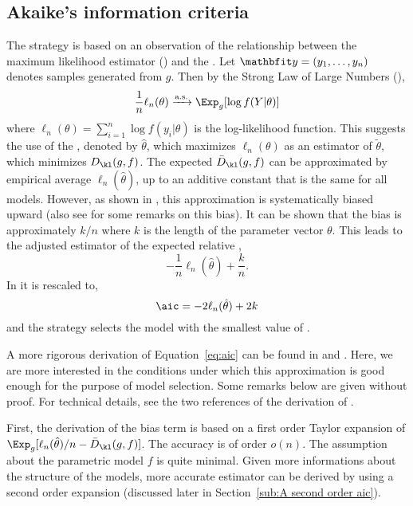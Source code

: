 \subsection{Akaike's information criteria}
\label{sub:Akaike's information criteria}

The \aic strategy is based on an observation of the relationship between the
maximum likelihood estimator (\mle) and the \kld. Let $\data =
(y_1,\dots,y_n)$ denotes \iid samples generated from $g$. Then by the Strong
Law of Large Numbers (\slln),
\begin{equation}
  \frac{1}{n}\ell_n(\theta) \xrightarrow{\text{a.s.}} \Exp_g[\log f(Y|\theta)]
  \label{eq:ml convergence}
\end{equation}
where $\ell_n(\theta) = \sum_{i=1}^n \log f(y_i|\theta)$ is the
log-likelihood function. This suggests the use of the \mle, denoted by
$\hat\theta$, which maximizes $\ell_n(\theta)$ as an estimator of
$\tilde\theta$, which minimizes $D_{\kl}(g,f)$. The expected \kld
$\bar{D}_{\kl}(g,f)$ can be approximated by empirical average
$\ell_n(\hat\theta)$, up to an additive constant that is the same for all
models. However, as shown in \cite{Akaike:1973uc}, this approximation is
systematically biased upward (also see \cite[][sec.~2.3]{Claeskens:2008tq}
for some remarks on this bias). It can be shown that the bias is
approximately $k/n$ where $k$ is the length of the parameter vector $\theta$.
This leads to the adjusted estimator of the expected relative \kld,
\begin{equation}
  -\frac{1}{n}\ell_n(\hat\theta) + \frac{k}{n}.
\end{equation}
In \cite{Akaike:1973uc} it is rescaled to,
\begin{equation}
  \aic = -2\ell_n(\hat\theta) + 2k
  \label{eq:aic}
\end{equation}
and the \aic strategy selects the model with the smallest value of \aic.

A more rigorous derivation of Equation~\eqref{eq:aic} can be found in
\cite[][sec.~2.3]{Claeskens:2008tq} and \cite[][sec.~6.2]{Burnham:2002wc}.
Here, we are more interested in the conditions under which this approximation
is good enough for the purpose of model selection. Some remarks below are
given without proof. For technical details, see the two references of the
derivation of \aic.

First, the derivation of the bias term is based on a first order Taylor
expansion of $\Exp_g[\ell_n(\hat\theta)/n - \bar{D}_{\kl}(g,f)]$. The
accuracy is of order $o(n)$. The assumption about the parametric model $f$ is
quite minimal. Given more informations about the structure of the models,
more accurate estimator can be derived by using a second order expansion
(discussed later in Section~\ref{sub:A second order aic}).

